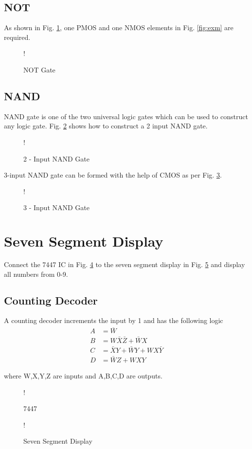 \documentclass[journal,12pt,twocolumn]{IEEEtran}
\begin{document}
\subsection{NOT}
As shown in Fig. \ref{fig:not}, one PMOS and one NMOS elements in Fig. \ref{fig:exm} are required.


\begin{figure}[!h]
\centering
\resizebox {\columnwidth} {!} {

}
\caption{NOT Gate}
\label{fig:not}
\end{figure}

\subsection{NAND}
 
NAND gate is one of the two universal logic gates which can be used to construct any logic gate.
Fig. \ref{fig:NAND-2} shows how to construct a 2 input NAND gate.
\begin{figure}[!h]
\centering
\resizebox {\columnwidth} {!} {

}
\caption{2 - Input NAND Gate}
\label{fig:NAND-2}
\end{figure}
%
3-input NAND gate can be formed with the help of CMOS as per Fig. \ref{fig:NAND-3}.
%
\begin{figure}[!h]
\centering
\resizebox {\columnwidth} {!} {

}
\caption{3 - Input NAND Gate}
\label{fig:NAND-3}
\end{figure}

\section{Seven Segment Display}
\begin{problem}
Connect the 7447 IC in Fig. \ref{fig:7447}  to the seven segment display in Fig. \ref{fig:sevenseg} and display all numbers from 0-9.
\end{problem}
%
\subsection{Counting Decoder}
%
A counting decoder increments the input by 1 and has the following logic
\begin{align}
\label{eq:countingA}
A&=\overline{W}
\\
B&=W\bar{X}\bar{Z}+\bar{W}X 
\\
C&=\bar{X}Y+\bar{W}Y+WX\bar{Y}
\\
D&=\bar{W}Z+WXY
\label{eq:countingD}
\end{align}
\begin{center}
\end{center}
where W,X,Y,Z are inputs and A,B,C,D are outputs.
%
\begin{figure}[!h]
\centering
\resizebox {\columnwidth} {!} {

}
\caption{7447}
\label{fig:7447}
\end{figure}
%
%
\begin{figure}[!h]
\centering
\resizebox {\columnwidth} {!} {

}
\caption{Seven Segment Display}
\label{fig:sevenseg}
\end{figure}
%
\end{document}
